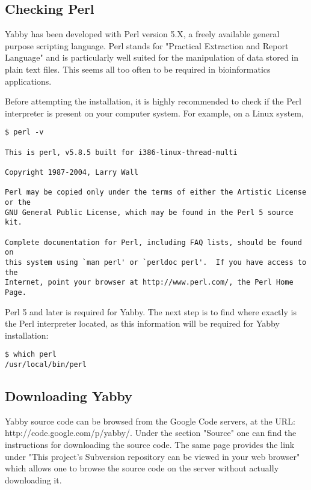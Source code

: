 \subsection{Checking Perl}


Yabby has been developed with Perl version 5.X, a freely available
general purpose scripting language. Perl stands for "Practical
Extraction and Report Language" and is particularly well suited for
the manipulation of data stored in plain text files. This seems
all too often to be required in bioinformatics applications.

Before attempting the installation, it is highly recommended to
check if the Perl interpreter is present on your computer system.
For example, on a Linux system,

\begin{verbatim}
$ perl -v

This is perl, v5.8.5 built for i386-linux-thread-multi

Copyright 1987-2004, Larry Wall

Perl may be copied only under the terms of either the Artistic License or the
GNU General Public License, which may be found in the Perl 5 source kit.

Complete documentation for Perl, including FAQ lists, should be found on
this system using `man perl' or `perldoc perl'.  If you have access to the
Internet, point your browser at http://www.perl.com/, the Perl Home Page.
\end{verbatim}

Perl 5 and later is required for Yabby.  The next step is to find where
exactly is the Perl interpreter located, as this information will be
required for Yabby installation:

\begin{verbatim}
$ which perl
/usr/local/bin/perl
\end{verbatim}

\subsection{Downloading Yabby}

Yabby source code can be browsed from the Google Code servers, at
the URL: http://code.google.com/p/yabby/. Under the
section "Source" one can find the instructions for downloading the
source code. The same page provides the link under "This project's
Subversion repository can be viewed in your web browser" which allows
one to browse the source code on the server without actually
downloading it.

